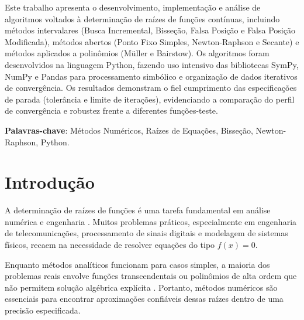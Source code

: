 \documentclass[
	12pt,				%
	openright,			%
	oneside,			%
	a4paper,			%
	english,			%
	brazil				%
	]{abntex2}
\begin{document}
\frenchspacing 


\imprimircapa
\imprimirfolhaderosto*

\setlength{\absparsep}{18pt} 
\begin{resumo}
Este trabalho apresenta o desenvolvimento, implementação e análise de algoritmos voltados à determinação de raízes de funções contínuas, incluindo métodos intervalares (Busca Incremental, Bisseção, Falsa Posição e Falsa Posição Modificada), métodos abertos (Ponto Fixo Simples, Newton-Raphson e Secante) e métodos aplicados a polinômios (Müller e Bairstow). Os algoritmos foram desenvolvidos na linguagem Python, fazendo uso intensivo das bibliotecas SymPy, NumPy e Pandas para processamento simbólico e organização de dados iterativos de convergência. Os resultados demonstram o fiel cumprimento das especificações de parada (tolerância e limite de iterações), evidenciando a comparação do perfil de convergência e robustez frente a diferentes funções-teste.

 \textbf{Palavras-chave}: Métodos Numéricos, Raízes de Equações, Bisseção, Newton-Raphson, Python.
\end{resumo}

\tableofcontents*
\cleardoublepage

\textual

\chapter{Introdução}

A determinação de raízes de funções é uma tarefa fundamental em análise numérica e engenharia \cite{chapra2016,burden2015}. Muitos problemas práticos, especialmente em engenharia de telecomunicações, processamento de sinais digitais e modelagem de sistemas físicos, recaem na necessidade de resolver equações do tipo $f(x) = 0$. 

Enquanto métodos analíticos funcionam para casos simples, a maioria dos problemas reais envolve funções transcendentais ou polinômios de alta ordem que não permitem solução algébrica explícita \cite{quarteroni2007}. Portanto, métodos numéricos são essenciais para encontrar aproximações confiáveis dessas raízes dentro de uma precisão especificada.
\end{document}
